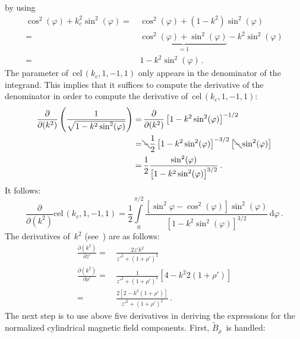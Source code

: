 by using
\begin{align}
      \cos^2(\varphi) + k_c^2 \sin^2(\varphi)
 =&\, \cos^2(\varphi) + (1 - k^2) \sin^2(\varphi) \nonumber \\
 =&\, \underbrace{\cos^2(\varphi) + \sin^2(\varphi)}_{=1} - k^2 \sin^2(\varphi) \nonumber \\
 =&\, 1 - k^2 \sin^2(\varphi) \, .
\end{align}
The parameter of~$\textrm{cel}\,(k_c, 1, -1, 1)$ only appears in the denominator of the integrand.
This implies that it suffices to compute the derivative of the denominator
in order to compute the derivative of~$\textrm{cel}\,(k_c, 1, -1, 1)$:
\begin{align}
      \frac{\partial}{\partial(k^2)} \left( \frac{1}{\sqrt{1 - k^2 \sin^2(\varphi)}} \right)
 =&\, \frac{\partial}{\partial(k^2)} \left[1 - k^2 \sin^2(\varphi)\right]^{-1/2} \nonumber \\
 =&\, \bcancel{-} \frac{1}{2} \left[1 - k^2 \sin^2(\varphi)\right]^{-3/2} \left[ \bcancel{-} \sin^2(\varphi) \right] \nonumber \\
 =&\, \frac{1}{2} \frac{\sin^2(\varphi)}{\left[1 - k^2 \sin^2(\varphi)\right]^{3/2}} \, .
\end{align}
It follows:
\begin{equation}
  \frac{\partial}{\partial(k^2)} \textrm{cel}\,(k_c, 1, -1, 1)
 = \frac{1}{2} \int\limits_0^{\pi/2} \frac{\left[\sin^2{\varphi} - \cos^2(\varphi)\right]\sin^2(\varphi)}{\left[1 - k^2 \sin^2(\varphi)\right]^{3/2}} \,\mathrm{d}\varphi \, .
\end{equation}
The derivatives of~$k^2$ (see~) are as follows:
\begin{align}
      \frac{\partial (k^2)}{\partial z'}
 =&\, \frac{2 z' k^2}{z'^2 + (1 + \rho')^2} \\
      \frac{\partial (k^2)}{\partial \rho'}
 =&\, \frac{1}{z'^2 + (1 + \rho')^2} \left[ 4 - k^2 2 (1 + \rho') \right] \\
 =&\, \frac{2 \left[ 2 - k^2 (1 + \rho') \right]}{z'^2 + (1 + \rho')^2} \, .
\end{align}
The next step is to use above five derivatives in deriving the expressions
for the normalized cylindrical magnetic field components.
First, $\tilde{B}_\rho$~is handled:
